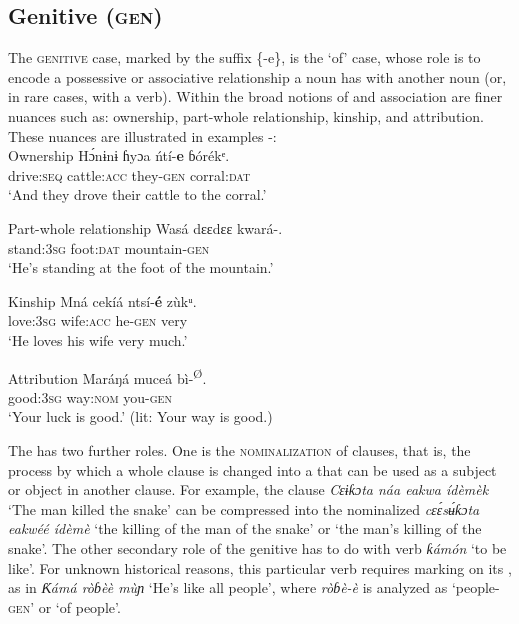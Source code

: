 \subsection{Genitive (\textsc{gen})}\label{sec:7.5}


The \textsc{genitive} case, marked by the suffix \{-e\}, is the ‘of’ case, whose role is to encode a possessive or associative relationship a noun has with another noun (or, in rare cases, with a verb). Within the broad notions of  and association are finer nuances such as: ownership, part-whole relationship, kinship, and attribution. These nuances are illustrated in examples -:\\




Ownership
\ea\label{ex:case:22}
\gll H\'{ɔ}nɨnɨ   ɦyɔa     ńtí-\textbf{e}     ɓórékᵉ. \\
drive:\textsc{seq}   cattle:\textsc{acc}   they-\textsc{gen}   corral:\textsc{dat}    \\
\glt ‘And they drove their cattle to the corral.’ 
\z




Part-whole relationship
\ea\label{ex:case:23}
\gll Wasá     dɛɛdɛɛ   kwará-\textbf{\ᵉ}. \\
stand:\textsc{3sg}   foot:\textsc{dat}   mountain-\textsc{gen}    \\
\glt ‘He’s standing at the foot of the mountain.’ 
\z




Kinship
\ea\label{ex:case:24}
\gll M{\Í}ná     cekíá     ntsí-\textbf{é}     zùkᵘ. \\
love:\textsc{3sg}   wife:\textsc{acc}   he-\textsc{gen}   very    \\
\glt ‘He loves his wife very much.’ 
\z




Attribution
\ea\label{ex:case:25}
\gll Maráŋá   muceá   bì-\textsuperscript{Ø}. \\
good:\textsc{3sg}   way:\textsc{nom}   you-\textsc{gen}    \\
\glt ‘Your luck is good.’ (lit: Your way is good.) 
\z


The  has two further roles. One is the \textsc{nominalization} of clauses, that is, the process by which a whole clause is changed into a  that can be used as a subject or object in another clause. For example, the clause \textit{Cɛɨƙɔta náa eakwa ídèmèk\ᵃ} ‘The man killed the snake’ can be compressed into the nominalized \textit{cɛ\'{ɛ}s\'{ʉ}ƙɔta eakwéé ídèmè} ‘the killing of the man of the snake’ or ‘the man’s killing of the snake’. The other secondary role of the genitive has to do with verb \textit{ƙámón} ‘to be like’. For unknown historical reasons, this particular verb requires  marking on its , as in \textit{Ƙámá ròɓèè mùɲ} ‘He’s like all people’, where \textit{ròɓè-è} is analyzed as ‘people-\textsc{gen’} or `of people'.





